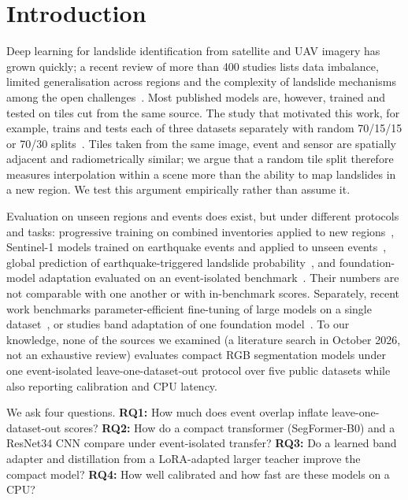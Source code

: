 \documentclass[11pt]{article}
\begin{document}
\section{Introduction}
Deep learning for landslide identification from satellite and UAV imagery has grown quickly; a recent review of more than 400 studies lists data imbalance, limited generalisation across regions and the complexity of landslide mechanisms among the open challenges~\cite{jiang2026review}. Most published models are, however, trained and tested on tiles cut from the same source. The study that motivated this work, for example, trains and tests each of three datasets separately with random 70/15/15 or 70/30 splits~\cite{srivats2026}. Tiles taken from the same image, event and sensor are spatially adjacent and radiometrically similar; we argue that a random tile split therefore measures interpolation within a scene more than the ability to map landslides in a new region. We test this argument empirically rather than assume it.

Evaluation on unseen regions and events does exist, but under different protocols and tasks: progressive training on combined inventories applied to new regions~\cite{prakash2021}, Sentinel-1 models trained on \LitNavaEvents{} earthquake events and applied to unseen events~\cite{nava2026sar}, global prediction of earthquake-triggered landslide probability~\cite{fan2025nsr}, and foundation-model adaptation evaluated on an event-isolated benchmark~\cite{liu2026geophys}. Their numbers are not comparable with one another or with in-benchmark scores. Separately, recent work benchmarks parameter-efficient fine-tuning of large models on a single dataset~\cite{kowsher2026}, or studies band adaptation of one foundation model~\cite{li2025prithvi}. To our knowledge, none of the sources we examined (a literature search in October 2026, not an exhaustive review) evaluates compact RGB segmentation models under one event-isolated leave-one-dataset-out protocol over five public datasets while also reporting calibration and CPU latency.

We ask four questions. \textbf{RQ1:} How much does event overlap inflate leave-one-dataset-out scores? \textbf{RQ2:} How do a compact transformer (SegFormer-B0) and a ResNet34 CNN compare under event-isolated transfer? \textbf{RQ3:} Do a learned band adapter and distillation from a LoRA-adapted larger teacher improve the compact model? \textbf{RQ4:} How well calibrated and how fast are these models on a CPU?
\end{document}
